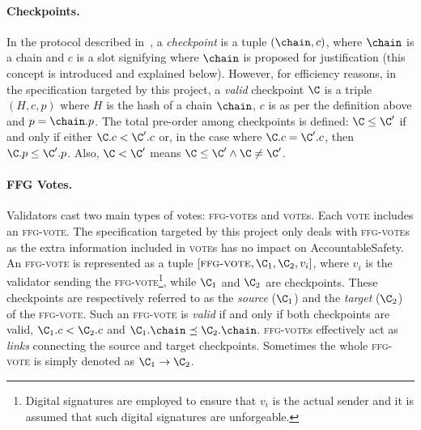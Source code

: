 \paragraph{Checkpoints.}
In the protocol described in~\cite{d20243}, a \emph{checkpoint} is a tuple $(\chain, c)$, where \(\chain \) is a chain and \( c \) is a slot signifying where \( \chain \) is proposed for justification (this concept is introduced and explained below).
However, for efficiency reasons, in the specification targeted by this project, a \emph{valid} checkpoint $\C$ is a triple $(H, c, p)$ where $H$ is the hash of a chain $\chain$, $c$ is as per the definition above and $p =  \chain.p$.
The total pre-order among checkpoints is defined:
$\C \leq \C'$ if and only if either \(\C.c < \C'.c\) or, in the case where \(\C.c = \C'.c\), then \(\C.p \leq \C'.p\). 
Also, $\C < \C'$ means $\C \leq \C' \land \C \neq \C'$.


\paragraph*{FFG Votes.}
Validators cast two main types of votes: \textsc{ffg-vote}s and \textsc{vote}s. 
Each \textsc{vote} includes an \textsc{ffg-vote}.
The specification targeted by this project only deals with \textsc{ffg-vote}s as the extra information included in  \textsc{vote}s has no impact on AccountableSafety.
An \textsc{ffg-vote} is represented as a tuple \([\textsc{ffg-vote}, \C_1, \C_2, v_i]\), where {$v_i$ is the validator sending the \textsc{ffg-vote}\footnote{Digital signatures are employed to ensure that $v_i$ is the actual sender and it is assumed that such digital signatures are unforgeable.}, while} \(\C_1\) and \(\C_2\) are checkpoints.
These checkpoints are respectively referred to as the \emph{source} (\(\C_1\)) and the \emph{target} (\(\C_2\)) of the \textsc{ffg-vote}.
Such an \textsc{ffg-vote} is \emph{valid}
if and only if both checkpoints are valid, 
\(\C_1.c < \C_2.c\) and  \(\C_1.\chain \preceq \C_2.\chain\). 
\textsc{ffg-vote}s effectively act as \emph{links} connecting the source and target checkpoints. Sometimes the whole \textsc{ffg-vote} is simply denoted as \(\C_1 \to \C_2\).

